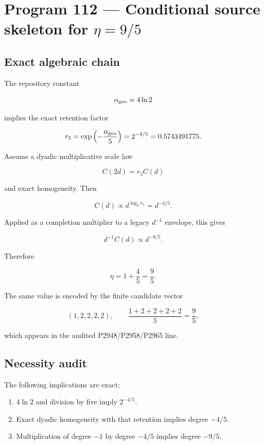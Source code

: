 \documentclass[11pt,a4paper,openany]{report}
\begin{document}
\section{\texorpdfstring{Program 112 --- Conditional source skeleton for \(\eta=9/5\)}{Program 112 --- Conditional source skeleton for =9/\allowbreak{}5}}

\subsection{Exact algebraic chain}

The repository constant

\[
\alpha_{\rm geo}=4\ln2
\]

implies the exact retention factor

\[
r_5
=
\exp\left(-\frac{\alpha_{\rm geo}}5\right)
=
2^{-4/5}
=0.5743491775.
\]

Assume a dyadic multiplicative scale law

\[
C(2d)=r_5 C(d)
\]

and exact homogeneity. Then

\[
C(d)\propto d^{\log_2r_5}
=d^{-4/5}.
\]

Applied as a completion multiplier to a legacy \(d^{-1}\) envelope, this gives

\[
d^{-1}C(d)\propto d^{-9/5}.
\]

Therefore

\[
\eta=1+\frac45=\frac95.
\]

The same value is encoded by the finite candidate vector

\[
(1,2,2,2,2),
\qquad
\frac{1+2+2+2+2}{5}=\frac95,
\]

which appears in the audited P2948/\allowbreak{}P2958/\allowbreak{}P2965 line.

\subsection{Necessity audit}

The following implications are exact:

\begin{enumerate}
\item 
\(4\ln2\) and division by five imply \(2^{-4/5}\).

\item 
Exact dyadic homogeneity with that retention implies degree \(-4/5\).

\item 
Multiplication of degree \(-1\) by degree \(-4/5\) implies degree \(-9/5\).

\end{enumerate}
\end{document}
